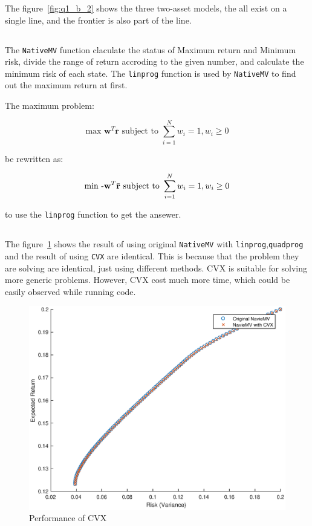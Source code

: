 \documentclass[a4paper, 12pt]{article}
\begin{document}
	The figure~\ref{fig:q1_b_2} shows the three two-asset models, the all exist on a single line, and the frontier is also part of the line.

	
	\subsection{}
	The \texttt{NativeMV} function claculate the status of Maximum return and Minimum risk, divide the range of return accroding to the given number, and calculate the minimum risk of each state. The \texttt{linprog} function is used by \texttt{NativeMV} to find out the maximum return at first.
	
	The maximum problem:
	
	\[\text{max } \mathbf{w}^T \bar{\mathbf{r}} \text{ subject to } \sum_{i=1}^N w_i = 1, w_i \geq 0\]
	
	be rewritten as:
	
	\[\text{min } \textnormal{-}\mathbf{w}^T \bar{\mathbf{r}} \text{ subject to } \sum_{i=1}^N w_i = 1, w_i \geq 0\]
	
	to use the  \texttt{linprog} function to get the ansewer.
	
	\subsection{}
	The figure~\ref{fig:q1_d} shows the result of using original \texttt{NativeMV} with \texttt{linprog},\texttt{quadprog} and the result of using \texttt{CVX} are identical. This is because that the problem they are solving are identical, just using different methods. CVX is suitable for solving more generic problems. However, CVX cost much more time, which could be easily observed while running code.
	\begin{figure}
		\begin{center}
       		\includegraphics[width=0.85\linewidth]{q1_d.eps}
		\end{center}
		\caption{Performance of CVX}
   		\label{fig:q1_d}
	\end{figure}
	
\end{document}
